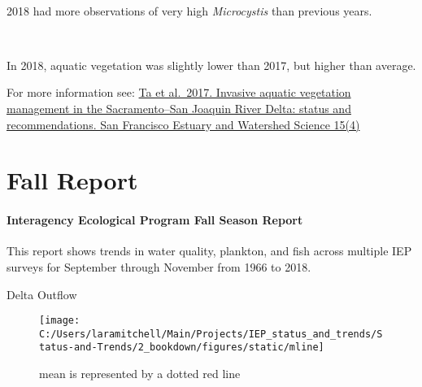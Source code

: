 \documentclass[
]{book}
\begin{document}
\begin{panel-grid}
\begin{columns-nocenter}
\begin{column40}
~

\end{column40}

\begin{column800}

2018 had more observations of very high \emph{Microcystis} than previous years.

\end{column800}

\begin{column40}

~

\end{column40}

\begin{column800}

In 2018, aquatic vegetation was slightly lower than 2017, but higher than average.

\end{column800}

\end{columns-nocenter}

\end{panel-grid}

\begin{disclaimer}
For more information see:
\href{https://escholarship.org/uc/item/828355w6}{Ta et al.~2017.
Invasive aquatic vegetation management in the Sacramento--San Joaquin
River Delta: status and recommendations. San Francisco Estuary and
Watershed Science 15(4)}
\end{disclaimer}

\hypertarget{Fall}{%
\chapter{Fall Report}\label{Fall}}

\hypertarget{interagency-ecological-program-fall-season-report}{%
\subsubsection{Interagency Ecological Program Fall Season Report}\label{interagency-ecological-program-fall-season-report}}

This report shows trends in water quality, plankton, and fish across multiple IEP
surveys for September through November from 1966 to 2018.

Delta Outflow

\begin{figure}
\texttt{[image: C:/Users/laramitchell/Main/Projects/IEP\_status\_and\_trends/Status-and-Trends/2\_bookdown/figures/static/mline]} \caption{mean is represented by a dotted red line}\label{fig:unnamed-chunk-92}
\end{figure}
\end{document}
